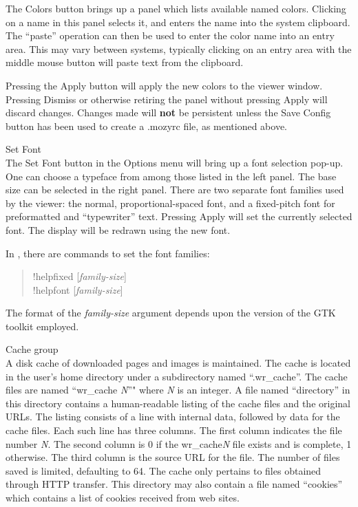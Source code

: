 \begin{description}
The {\cb Colors} button brings up a panel which lists available named
colors.  Clicking on a name in this panel selects it, and enters the
name into the system clipboard.  The ``paste'' operation can then be
used to enter the color name into an entry area.  This may vary
between systems, typically clicking on an entry area with the middle
mouse button will paste text from the clipboard.

Pressing the {\cb Apply} button will apply the new colors to the
viewer window.  Pressing {\cb Dismiss} or otherwise retiring the panel
without pressing {\cb Apply} will discard changes.  Changes made will
{\bf not} be persistent unless the {\cb Save Config} button has been
used to create a {\vt .mozyrc} file, as mentioned above.

\item{\cb Set Font}\\
The {\cb Set Font} button in the {\cb Options} menu will bring up a
font selection pop-up.  One can choose a typeface from among those
listed in the left panel.  The base size can be selected in the right
panel.  There are two separate font families used by the viewer:  the
normal, proportional-spaced font, and a fixed-pitch font for
preformatted and ``typewriter'' text.  Pressing {\cb Apply} will set
the currently selected font.  The display will be redrawn using the
new font.

In {\Xic}, there are commands to set the font families:
\begin{quote}\vt
!helpfixed [{\it family-size\/}]\\
!helpfont [{\it family-size}]
\end{quote}
The format of the {\it family-size} argument depends upon the version
of the GTK toolkit employed.

\item{\cb Cache} group\\
A disk cache of downloaded pages and images is maintained.  The cache
is located in the user's home directory under a subdirectory named
``{\vt .wr\_cache}''.  The cache files are named ``{\vt wr\_cache}{\it
N}''" where {\it N} is an integer.  A file named ``{\vt directory}''
in this directory contains a human-readable listing of the cache files
and the original URLs.  The listing consists of a line with internal
data, followed by data for the cache files.  Each such line has three
columns.  The first column indicates the file number {\it N}.  The
second column is 0 if the {\vt wr\_cache}{\it N} file exists and is
complete, 1 otherwise.  The third column is the source URL for the
file.  The number of files saved is limited, defaulting to 64.  The
cache only pertains to files obtained through HTTP transfer.  This
directory may also contain a file named ``{\vt cookies}'' which
contains a list of cookies received from web sites. 


\end{description}
